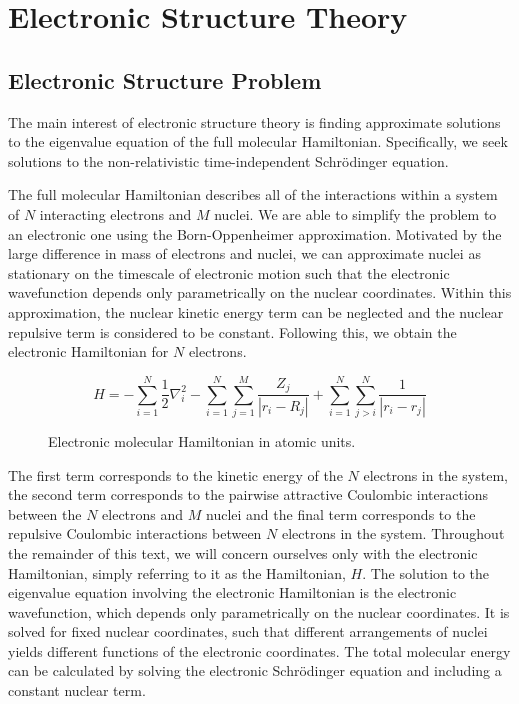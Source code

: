 \section{\label{electronic-structure-theory}Electronic Structure Theory}

\subsection{Electronic Structure Problem}


The main interest of electronic structure theory is finding approximate solutions to the eigenvalue equation of the full molecular Hamiltonian. Specifically, we seek solutions to the non-relativistic time-independent Schrödinger equation.

The full molecular Hamiltonian describes all of the interactions within a system of $N$ interacting electrons and $M$ nuclei. We are able to simplify the problem to an electronic one using the Born-Oppenheimer approximation. Motivated by the large difference in mass of electrons and nuclei, we can approximate nuclei as stationary on the timescale of electronic motion such that the electronic wavefunction depends only parametrically on the nuclear coordinates. Within this approximation, the nuclear kinetic energy term can be neglected and the nuclear repulsive term is considered to be constant. Following this, we obtain the electronic Hamiltonian for $N$ electrons.

\begin{figure}[H]
\begin{equation*}
    H =
    - \sum_{i=1}^{N} \frac{1}{2} \nabla^{2}_{i}
    - \sum_{i=1}^{N} \sum_{j=1}^{M} \frac{Z_j}{|r_{i} - R_{j}|}
    + \sum_{i=1}^{N} \sum_{j>i}^{N} \frac{1}{|r_{i} - r_{j}|}
\end{equation*}
\caption{Electronic molecular Hamiltonian in atomic units.}
\end{figure}

The first term corresponds to the kinetic energy of the $N$ electrons in the system, the second term corresponds to the pairwise attractive Coulombic interactions between the $N$ electrons and $M$ nuclei and the final term corresponds to the repulsive Coulombic interactions between $N$ electrons in the system. Throughout the remainder of this text, we will concern ourselves only with the electronic Hamiltonian, simply referring to it as the Hamiltonian, $H$. The solution to the eigenvalue equation involving the electronic Hamiltonian is the electronic wavefunction, which depends only parametrically on the nuclear coordinates. It is solved for fixed nuclear coordinates, such that different arrangements of nuclei yields different functions of the electronic coordinates. The total molecular energy can be calculated by solving the electronic Schrödinger equation and including a constant nuclear term.


